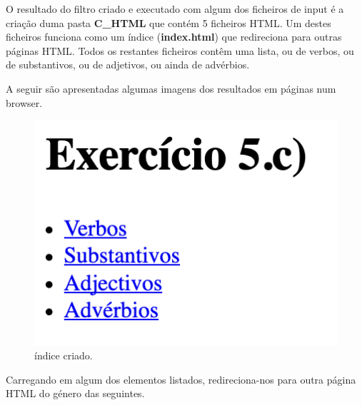 \documentclass[11pt,a4paper]{report}
\begin{document}
O resultado do filtro criado e executado com algum dos ficheiros de input é a criação duma pasta \textbf{C\_HTML} que contém 5 ficheiros HTML. Um destes ficheiros funciona como um índice (\textbf{index.html}) que redireciona para outras páginas HTML. Todos os restantes ficheiros contêm uma lista, ou de verbos, ou de substantivos, ou de adjetivos, ou ainda de advérbios.

A seguir são apresentadas algumas imagens dos resultados em páginas num browser.

\begin{figure}[H]
\centering
\includegraphics[scale=0.6]{index.png}
\caption{índice criado.}
\label{img:index}
\end{figure}

Carregando em algum dos elementos listados, redireciona-nos para outra página HTML do género das seguintes.
\end{document}
